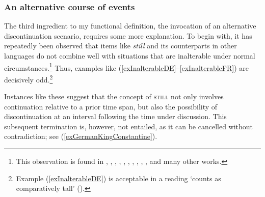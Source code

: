 \subsubsection{An alternative course of events}
The third ingredient to my functional definition, the invocation of an alternative discontinuation scenario, requires some more explanation. To begin with, it has repeatedly been observed that  items like  \textit{still} and its counterparts in other languages do not combine well with situations that are inalterable under normal circumstances.\footnote{This observation is found in \textcite{CranePersohn2021}, \textcite[145]{Donazzan2008}, \textcite{Doherty1973}, \textcite[ch. 4]{MosegaardHansen2008}, \textcite{Jenny2001}, \textcite{Kockelman2020}, \textcite{Michaelis1993}, \textcite{NedjalkovJaxontov1988}, \textcite[§30.8h–j]{RAEGramatica}, \textcite[391]{Weber1989}, and many other works.} Thus, examples like (\ref{exInalterableDE}–\ref{exInalterableFR}) are decisively odd.\footnote{Example (\ref{exInalterableDE}) is acceptable in a  reading  \lq counts as comparatively tall\rq{ }().}

\begin{exe}


\end{exe}

Instances like these suggest that the concept of \textsc{still} not only involves continuation relative to a prior time span, but also the possibility of discontinuation at an interval following the time under discussion. This subsequent termination is, however, not entailed, as it can be cancelled without contradiction; see (\ref{exGermanKingConstantine}).

